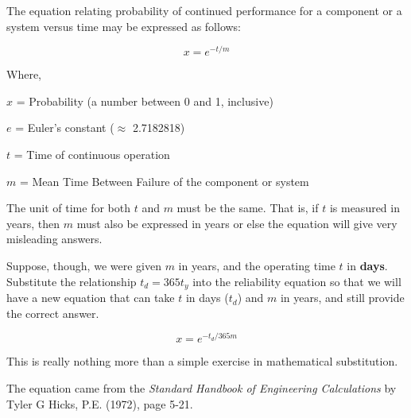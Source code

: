 

The equation relating probability of continued performance for a component or a system versus time may be expressed as follows:

$$x = e^{-t / m}$$

\noindent
Where,

$x$ = Probability (a number between 0 and 1, inclusive)

$e$ = Euler's constant ($\approx$ 2.7182818)

$t$ = Time of continuous operation

$m$ = Mean Time Between Failure of the component or system

\vskip 10pt

The unit of time for both $t$ and $m$ must be the same.  That is, if $t$ is measured in years, then $m$ must also be expressed in years or else the equation will give very misleading answers.

Suppose, though, we were given $m$ in years, and the operating time $t$ in {\bf days}.  Substitute the relationship $t_d = 365 t_y$ into the reliability equation so that we will have a new equation that can take $t$ in days ($t_d$) and $m$ in years, and still provide the correct answer.







$$x = e^{-t_d / 365 m}$$







This is really nothing more than a simple exercise in mathematical substitution.

\vskip 10pt

The equation came from the {\it Standard Handbook of Engineering Calculations} by Tyler G Hicks, P.E. (1972), page 5-21.





